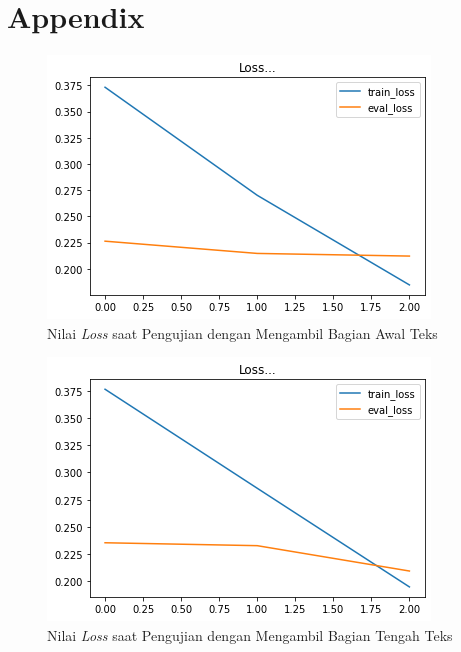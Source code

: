 \section*{Appendix}
\label{sec:appendix}

\begin{figure}[h]
    \begin{center}
        \includegraphics[width= 0.9\linewidth]{gambar/loss_concat_awal.png}
        \caption{Nilai \textit{Loss} saat Pengujian dengan Mengambil Bagian Awal Teks}
        \label{fig: loss_const_awal}
    \end{center}
\end{figure}

\begin{figure}[h]
    \begin{center}
        \includegraphics[width= 0.9\linewidth]{gambar/loss_concat_tengah.png}
        \caption{Nilai \textit{Loss} saat Pengujian dengan Mengambil Bagian Tengah Teks}
        \label{fig: loss_const_tengah}
    \end{center}
\end{figure}


